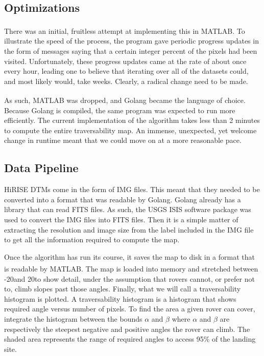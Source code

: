 \documentclass[12pt]{article}
\newcommand{\MATLAB}{MATLAB\textsuperscript{\textregistered}}
\begin{document}
\subsection{Optimizations}
\label{sub:optimizations}
\par There was an initial, fruitless attempt at implementing this in \MATLAB{}. To illustrate the speed of the process, the program gave periodic progress updates in the form of messages saying that a certain integer percent of the pixels had been visited. Unfortunately, these progress updates came at the rate of about once every hour, leading one to believe that iterating over all of the datasets could, and most likely would, take weeks. Clearly, a radical change need to be made.
\par As such, \MATLAB{} was dropped, and Golang became the language of choice. Because Golang is compiled, the same program was expected to run more efficiently. The current implementation of the algorithm takes less than 2 minutes to compute the entire traversability map. An immense, unexpected, yet welcome change in runtime meant that we could move on at a more reasonable pace.

\subsection{Data Pipeline}
\label{sub:data_pipeline}
\par HiRISE DTMs come in the form of IMG files. This meant that they needed to be converted into a format that was readable by Golang. Golang already has a library that can read FITS files. As such, the USGS ISIS software package was used to convert the IMG files into FITS files. Then it is a simple matter of extracting the resolution and image size from the label included in the IMG file to get all the information required to compute the map.
\par Once the algorithm has run its course, it saves the map to disk in a format that is readable by \MATLAB{}. The map is loaded into memory and stretched between -20\textdegree and 20\textdegree to show detail, under the assumption that rovers cannot, or prefer not to, climb slopes past those angles. Finally, what we will call a traversability histogram is plotted. A traversability histogram is a histogram that shows required angle versus number of pixels. To find the area a given rover can cover, integrate the histogram between the bounds $\alpha$ and $\beta$ where $\alpha$ and $\beta$ are respectively the steepest negative and positive angles the rover can climb. The shaded area represents the range of required angles to access 95\% of the landing site.
\end{document}
